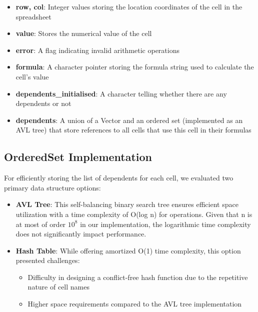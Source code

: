 \documentclass[10pt,a4paper]{article}  %
\begin{document}
\begin{itemize}
    \item \textbf{row, col}: Integer values storing the location coordinates of the cell in the spreadsheet
    \item \textbf{value}: Stores the numerical value of the cell
    \item \textbf{error}: A flag indicating invalid arithmetic operations 
    \item \textbf{formula}: A character pointer storing the formula string used to calculate the cell's value
    \item \textbf{dependents\_initialised}: A character telling whether there are any dependents or not
    \item \textbf{dependents}: A union of a Vector and an ordered set (implemented as an AVL tree) that store references to all cells that use this cell in their formulas
    
\end{itemize}





\subsection{OrderedSet Implementation}
For efficiently storing the list of dependents for each cell, we evaluated two primary data structure options:

\begin{itemize}
    \item \textbf{AVL Tree}: This self-balancing binary search tree ensures efficient space utilization with a time complexity of O(log n) for operations. Given that n is at most of order $10^8$ in our implementation, the logarithmic time complexity does not significantly impact performance.
    
    \item \textbf{Hash Table}: While offering amortized O(1) time complexity, this option presented challenges:
    \begin{itemize}
        \item Difficulty in designing a conflict-free hash function due to the repetitive nature of cell names
        \item Higher space requirements compared to the AVL tree implementation
    \end{itemize}
\end{itemize}
\end{document}
